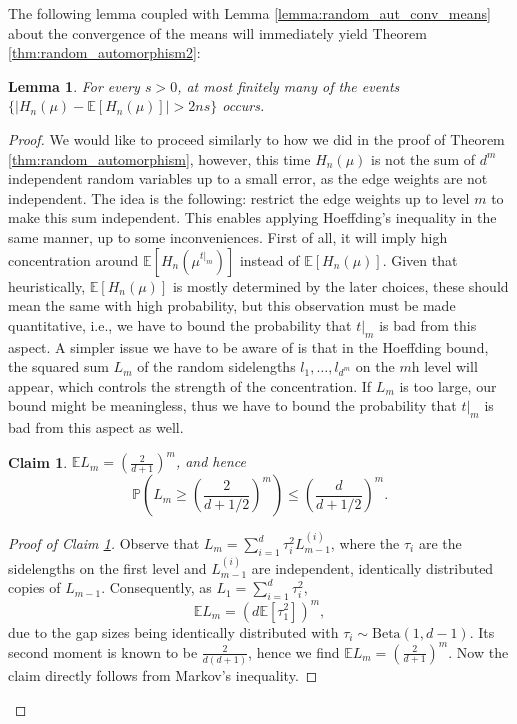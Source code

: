 \documentclass[11pt]{article}
\newcommand{\PP}{\mathbb{P}}
\newcommand{\EE}{\mathbb{E}}
\newtheorem{lemma}[theorem]{Lemma}
\newtheorem{claim}[theorem]{Claim}
\theoremstyle{definition}
\begin{document}
The following lemma coupled with Lemma \ref{lemma:random_aut_conv_means} about the convergence of the means will immediately yield Theorem \ref{thm:random_automorphism2}:

\begin{lemma} \label{lemma:convergent_probability_sum}
    For every $s>0$, at most finitely many of the events $\{|H_n(\mu) - \EE [H_n(\mu)]| >2ns\}$ occurs.
\end{lemma}

\begin{proof}

 We would like to proceed similarly to how we did in the proof of Theorem \ref{thm:random_automorphism}, however, this time $H_n(\mu)$ is not the sum of $d^m$ independent random variables up to a small error, as the edge weights are not independent. The idea is the following: restrict the edge weights up to level $m$ to make this sum independent. This enables applying Hoeffding's inequality in the same manner, up to some inconveniences. First of all, it will imply high concentration around $\EE [H_n(\mu^{t|_m})]$ instead of $\EE [H_n(\mu)]$. Given that heuristically, $\EE [H_n(\mu)]$ is mostly determined by the later choices, these should mean the same with high probability, but this observation must be made quantitative, i.e., we have to bound the probability that $t|_{m}$ is bad from this aspect. A simpler issue  we have to be aware of is that in the Hoeffding bound, the squared sum $L_m$ of the random sidelengths $l_1, \dots, l_{d^m}$ on the $m$h level will appear, which controls the strength of the concentration. If $L_m$ is too large, our bound might be meaningless, thus we have to bound the probability that $t|_{m}$ is bad from this aspect as well.

\begin{claim}\label{claim:squared_sum_small}
    $\EE L_m = \left(\frac{2}{d+1}\right)^m$, and hence
    $$\PP\left(L_m\geq \left(\frac{2}{d+1/2}\right)^m\right)\leq \left(\frac{d}{d+1/2}\right)^m.$$
\end{claim}

\begin{proof}[Proof of Claim \ref{claim:squared_sum_small}]
    Observe that $L_m =\sum_{i=1}^{d}\tau_i^2L_{m-1}^{(i)}$, where the $\tau_i$ are the sidelengths on the first level and $L_{m-1}^{(i)}$ are independent, identically distributed copies of $L_{m-1}$. Consequently, as $L_1= \sum_{i=1}^{d}\tau_i^2$,
    $$\EE L_m = (d\EE[\tau_1^2])^m,$$
    due to the gap sizes being identically distributed with $\tau_i\sim \mathrm{Beta}(1, d-1)$. Its second moment is known to be $\frac{2}{d(d+1)}$, hence we find $\EE L_m = \left(\frac{2}{d+1}\right)^m$.
    Now the claim directly follows from Markov's inequality.
\end{proof}


\end{proof}
\end{document}
